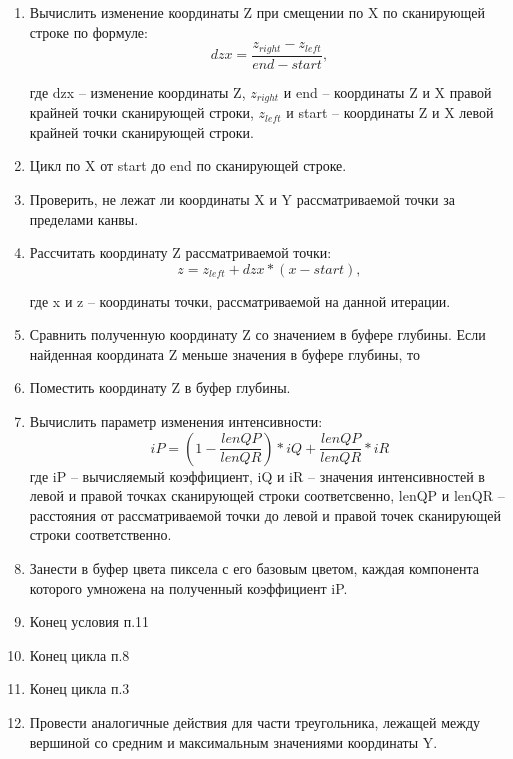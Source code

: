 \begin{enumerate}
	\item Вычислить изменение координаты Z при смещении по X по сканирующей строке по формуле:
	\begin{equation}
		dzx = \frac{z_{right} - z_{left}}{end - start} ,
	\end{equation}

	где dzx – изменение координаты Z, $z_{right}$ и end – координаты Z и X правой крайней точки сканирующей строки, $z_{left}$ и start – координаты Z и X левой крайней точки сканирующей строки.

	\item Цикл по X от start до end по сканирующей строке.
	\item Проверить, не лежат ли координаты X и Y рассматриваемой точки за пределами канвы.
	\item Рассчитать координату Z рассматриваемой точки:
	\begin{equation}
		z = z_{left} + dzx * (x - start) ,
	\end{equation}
	
	где x и z – координаты точки, рассматриваемой на данной итерации.

	\item Сравнить полученную координату Z со значением в буфере глубины. Если найденная координата Z меньше значения в буфере глубины, то
	\item Поместить координату Z в буфер глубины.
	\item Вычислить параметр изменения интенсивности:
	\begin{equation}
		iP = (1 - \frac{lenQP}{lenQR}) * iQ + \frac{lenQP}{lenQR} * iR
	\end{equation}
	где iP – вычисляемый коэффициент, iQ и iR – значения интенсивностей в левой и правой точках сканирующей строки соответсвенно, lenQP и lenQR – расстояния от рассматриваемой точки до левой и правой точек сканирующей строки соответственно.
	
	\item Занести в буфер цвета пиксела с его базовым цветом, каждая компонента которого умножена на полученный коэффициент iP.
	\item Конец условия п.11
	\item Конец цикла п.8
	\item Конец цикла п.3
	\item Провести аналогичные действия для части треугольника, лежащей между вершиной со средним и максимальным значениями координаты Y.
\end{enumerate}



